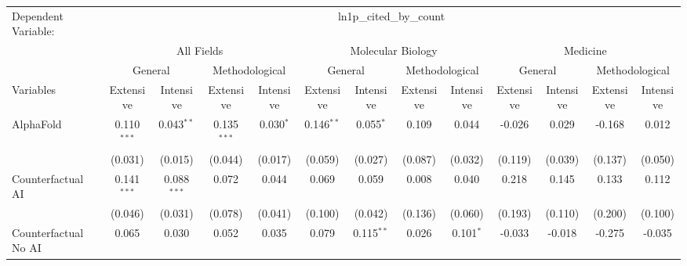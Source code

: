 \begingroup
\centering
\begin{tabular}{lcccccccccccc}
   \tabularnewline \midrule \midrule
   Dependent Variable: & \multicolumn{12}{c}{ln1p\_cited\_by\_count}\\
 & \multicolumn{4}{c}{All Fields} & \multicolumn{4}{c}{Molecular Biology} & \multicolumn{4}{c}{Medicine} \\
\cmidrule(lr){2-5} \cmidrule(lr){6-9} \cmidrule(lr){10-13}
 & \multicolumn{2}{c}{General} & \multicolumn{2}{c}{Methodological} & \multicolumn{2}{c}{General} & \multicolumn{2}{c}{Methodological} & \multicolumn{2}{c}{General} & \multicolumn{2}{c}{Methodological} \\
\cmidrule(lr){2-3} \cmidrule(lr){4-5} \cmidrule(lr){6-7} \cmidrule(lr){8-9} \cmidrule(lr){10-11} \cmidrule(lr){12-13}
Variables & \multicolumn{1}{c}{Extensive} & \multicolumn{1}{c}{Intensive} & \multicolumn{1}{c}{Extensive} & \multicolumn{1}{c}{Intensive} & \multicolumn{1}{c}{Extensive} & \multicolumn{1}{c}{Intensive} & \multicolumn{1}{c}{Extensive} & \multicolumn{1}{c}{Intensive} & \multicolumn{1}{c}{Extensive} & \multicolumn{1}{c}{Intensive} & \multicolumn{1}{c}{Extensive} & \multicolumn{1}{c}{Intensive} \\
\cmidrule(lr){1-1}\cmidrule(lr){2-2} \cmidrule(lr){3-3} \cmidrule(lr){4-4} \cmidrule(lr){5-5} \cmidrule(lr){6-6} \cmidrule(lr){7-7} \cmidrule(lr){8-8} \cmidrule(lr){9-9} \cmidrule(lr){10-10} \cmidrule(lr){11-11} \cmidrule(lr){12-12} \cmidrule(lr){13-13}
   AlphaFold                                & 0.110$^{***}$ & 0.043$^{**}$  & 0.135$^{***}$ & 0.030$^{*}$  & 0.146$^{**}$ & 0.055$^{*}$    & 0.109   & 0.044          & -0.026  & 0.029          & -0.168  & 0.012\\   
                                            & (0.031)       & (0.015)       & (0.044)       & (0.017)      & (0.059)      & (0.027)        & (0.087) & (0.032)        & (0.119) & (0.039)        & (0.137) & (0.050)\\   
   Counterfactual AI                        & 0.141$^{***}$ & 0.088$^{***}$ & 0.072         & 0.044        & 0.069        & 0.059          & 0.008   & 0.040          & 0.218   & 0.145          & 0.133   & 0.112\\   
                                            & (0.046)       & (0.031)       & (0.078)       & (0.041)      & (0.100)      & (0.042)        & (0.136) & (0.060)        & (0.193) & (0.110)        & (0.200) & (0.100)\\   
   Counterfactual No AI                     & 0.065         & 0.030         & 0.052         & 0.035        & 0.079        & 0.115$^{**}$   & 0.026   & 0.101$^{*}$    & -0.033  & -0.018         & -0.275  & -0.035\\   

\end{tabular}
